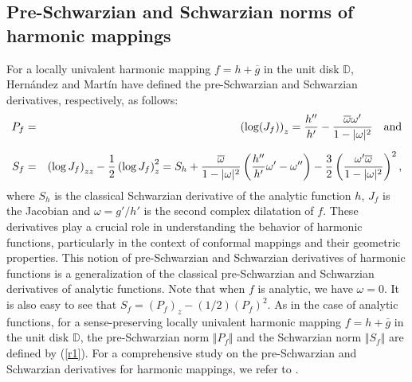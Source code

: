 \documentclass[12pt,reqno]{amsart}
\newtheorem{open problem}{Open problem}[section]
\newcommand{\beas}{\begin{eqnarray*}}
\newcommand{\eeas}{\end{eqnarray*}}
\numberwithin{equation}{section}
\begin{document}
\subsection{Pre-Schwarzian and Schwarzian norms of harmonic mappings}
\indent For a locally univalent harmonic mapping $f=h+\overline{g}$ in the unit disk $\mathbb{D}$, Hern\'andez and Mart\'in \cite{HM2015} have defined the pre-Schwarzian and Schwarzian derivatives, respectively, as follows:
\beas
P_f &=& \left(\log(J_f)\right)_z = \frac{h''}{h'}-\frac{\overline{\omega}\omega'}{1-|\omega|^2}\quad \text{and}\hfill\\[2mm]
S_f &=& \left(\log J_f\right)_{zz}-\frac{1}{2}\left(\log J_f\right)_z^2= S_h+\frac{\overline{\omega}}{1-|\omega|^2}\left(\frac{h''}{h'}\omega'-\omega''\right)-\frac{3}{2}\left(\frac{\omega'\overline{\omega}}{1-|\omega|^2}\right)^2,\eeas
where $S_h$ is the classical Schwarzian derivative of the analytic function $h$, $J_f$ is the Jacobian and $\omega=g'/h'$ is the second complex dilatation of $f$. These derivatives play a crucial role in understanding the behavior of harmonic functions, particularly in the context of conformal mappings and their geometric properties. 
This notion of pre-Schwarzian and Schwarzian derivatives of harmonic functions is a generalization of the classical pre-Schwarzian and Schwarzian derivatives of analytic functions. 
Note that when $f$ is analytic, we have $\omega=0.$ It is also easy to see that $S_f = (P_f)_z-(1/2)(P_f)^2.$ As in the case of analytic functions, for a sense-preserving 
locally univalent harmonic mapping $f = h+\bar{g}$ in the unit disk $\mathbb{D}$, the pre-Schwarzian norm $\Vert P_f\Vert$ and the Schwarzian norm $\Vert S_f\Vert$ are defined by (\ref{r1}). For a comprehensive study on the pre-Schwarzian and Schwarzian derivatives for harmonic mappings, we refer to \cite{HM2015, 2LP2018}. 
\end{document}
